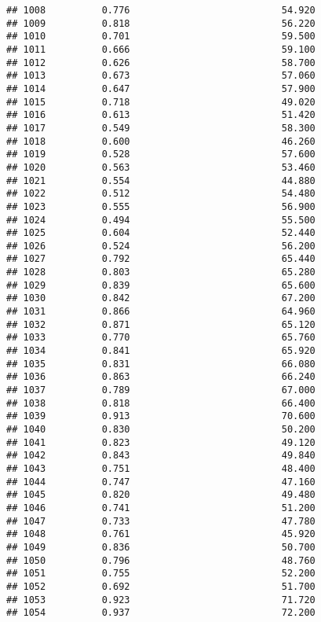 \documentclass[
]{article}
\begin{document}
\begin{verbatim}
## 1008          0.776                           54.920
## 1009          0.818                           56.220
## 1010          0.701                           59.500
## 1011          0.666                           59.100
## 1012          0.626                           58.700
## 1013          0.673                           57.060
## 1014          0.647                           57.900
## 1015          0.718                           49.020
## 1016          0.613                           51.420
## 1017          0.549                           58.300
## 1018          0.600                           46.260
## 1019          0.528                           57.600
## 1020          0.563                           53.460
## 1021          0.554                           44.880
## 1022          0.512                           54.480
## 1023          0.555                           56.900
## 1024          0.494                           55.500
## 1025          0.604                           52.440
## 1026          0.524                           56.200
## 1027          0.792                           65.440
## 1028          0.803                           65.280
## 1029          0.839                           65.600
## 1030          0.842                           67.200
## 1031          0.866                           64.960
## 1032          0.871                           65.120
## 1033          0.770                           65.760
## 1034          0.841                           65.920
## 1035          0.831                           66.080
## 1036          0.863                           66.240
## 1037          0.789                           67.000
## 1038          0.818                           66.400
## 1039          0.913                           70.600
## 1040          0.830                           50.200
## 1041          0.823                           49.120
## 1042          0.843                           49.840
## 1043          0.751                           48.400
## 1044          0.747                           47.160
## 1045          0.820                           49.480
## 1046          0.741                           51.200
## 1047          0.733                           47.780
## 1048          0.761                           45.920
## 1049          0.836                           50.700
## 1050          0.796                           48.760
## 1051          0.755                           52.200
## 1052          0.692                           51.700
## 1053          0.923                           71.720
## 1054          0.937                           72.200

\end{verbatim}
\end{document}
